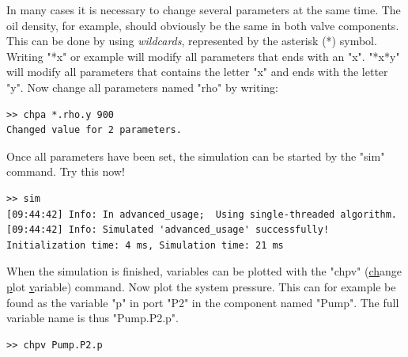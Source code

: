 \documentclass[a4paper,pdftex]{article}
\begin{document}
\begin{tutenumerate}
In many cases it is necessary to change several parameters at the same time. The oil density, for example, should obviously be the same in both valve components. This can be done by using \textit{wildcards}, represented by the asterisk (*) symbol. Writing "*x" or example will modify all parameters that ends with an "x". "*x*y" will modify all parameters that contains the letter "x" and ends with the letter "y". Now change all parameters named "rho" by writing:

\vspace{5pt}\hspace{10pt}
\begin{minipage}{0.5\linewidth}
\begin{verbatim}
>> chpa *.rho.y 900
Changed value for 2 parameters.
\end{verbatim}
\end{minipage}
\vspace{5pt}

Once all parameters have been set, the simulation can be started by the "sim" command. Try this now!

\vspace{5pt}\hspace{10pt}
\begin{minipage}{0.5\linewidth}
\begin{verbatim}
>> sim
[09:44:42] Info: In advanced_usage;  Using single-threaded algorithm.
[09:44:42] Info: Simulated 'advanced_usage' successfully! Initialization time: 4 ms, Simulation time: 21 ms
\end{verbatim}
\end{minipage}
\vspace{5pt}

When the simulation is finished, variables can be plotted with the "chpv" (\underline{ch}ange \underline{p}lot \underline{v}ariable) command. Now plot the system pressure. This can for example be found as the variable "p" in port "P2" in the component named "Pump". The full variable name is thus "Pump.P2.p".

\vspace{5pt}\hspace{10pt}
\begin{minipage}{0.5\linewidth}
\begin{verbatim}
>> chpv Pump.P2.p
\end{verbatim}
\end{minipage}
\vspace{5pt}


\end{tutenumerate}
\end{document}
